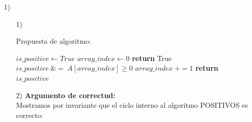 \documentclass[a4paper, 12pt]{report}
\begin{document}
\begin{enumerate}
\item[1)]{
\begin{enumerate}
    \item[1)]{
        Propuesta de algoritmo:\\
        \begin{algorithmic}[1]
        \State $is\_positive\gets True$
        \State $array\_index\gets 0$
            \State \textbf{return} True
        \EndIf
            \State $is\_positive\ \&=\ A[array\_index] \geq 0$
            \State $array\_index\ += 1$
        \EndWhile\label{euclidendwhile}
        \State \textbf{return} $is\_positive$
        \EndProcedure
    \end{algorithmic}
    }
    \item[2)]{\bf Argumento de correctud:\\}
    Mostramos por invariante que el ciclo interno al
    algoritmo POSITIVOS es correcto:\\


\end{enumerate}}
\end{enumerate}
\end{document}
